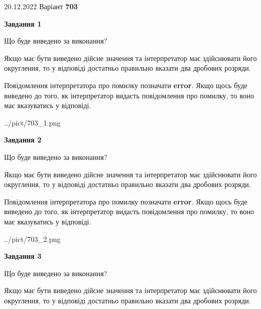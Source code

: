 \documentclass[12pt, ukrainian]{article}
\begin{document}
{20.12.2022 Варіант \No \textbf { 703 }\par}
{
\begin {Large}

{\begin {center}\textbf{Завдання 1}\end {center}}\par
Що буде виведено за виконання? \par

Якщо має бути виведено дійсне значення та інтерпретатор має здійснювати його округлення, 
то у відповіді достатньо правильно вказати два дробових розряди.

Повідомлення інтерпретатора про помилку позначати \textbf{error}.
Якщо щось буде виведено до того, як інтерпретатор видасть повідомлення про помилку, 
то воно має вказуватись у відповіді. \par

\begin{center}
	{../pict/703_1.png}
\end{center}
\newpage

{\begin {center}\textbf{Завдання 2}\end {center}}\par
Що буде виведено за виконання? \par

Якщо має бути виведено дійсне значення та інтерпретатор має здійснювати його округлення, 
то у відповіді достатньо правильно вказати два дробових розряди.

Повідомлення інтерпретатора про помилку позначати \textbf{error}.
Якщо щось буде виведено до того, як інтерпретатор видасть повідомлення про помилку, 
то воно має вказуватись у відповіді. \par

\begin{center}
	{../pict/703_2.png}
\end{center}
\newpage

{\begin {center}\textbf{Завдання 3}\end {center}}\par
Що буде виведено за виконання? \par

Якщо має бути виведено дійсне значення та інтерпретатор має здійснювати його округлення, 
то у відповіді достатньо правильно вказати два дробових розряди.


\end{Large}}
\end{document}
